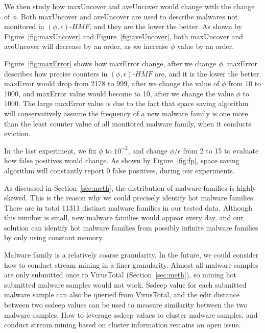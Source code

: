 We then study how maxUncover and aveUncover would change with the change of $\phi$.
Both maxUncover and aveUncover are used to describe malwares not monitored in $(\phi, \epsilon)\mbox{-}HMF$, 
and they are the lower the better. As shown by Figure~\ref{fig:maxUncover} and Figure~\ref{fig:aveUncover}, 
both maxUncover and aveUncover will decrease by an order, as we increase $\phi$ value by an order. 

Figure~\ref{fig:maxError} shows how maxError change, 
after we change $\phi$. 
maxError describes how precise counters in $(\phi, \epsilon)\mbox{-}HMF$ are, 
and it is the lower the better. 
maxError would drop from 2178 to 999, after we change the value of $\phi$ from 10 to 1000, 
and maxError value would become to 10, after we change the value $\phi$ to 1000. 
The large maxError value is due to the fact that space saving algorithm will conservatively 
assume the frequency of a new malware family is one more than the least counter value of all monitored malware family, 
when it conducts eviction. 

In the last experiment, we fix $\phi$ to $10^{-2}$, 
and change $\phi/\epsilon$ from 2 to 15 to evaluate how false positives would change. 
As shown by Figure~\ref{fig:fp}, space saving algorithm will constantly report 0 false positives, during our experiments. 

\label{sec:discussion1}
As discussed in Section~\ref{sec:meth}, 
the distribution of malware families is highly skewed. 
This is the reason why we could precisely identify hot malware families. 
There are in total 11311 distinct malware families in our tested data. 
Although this number is small, new malware families would appear every day, 
and our solution can identify hot malware families from possibly 
infinite malware families by only using constant memory. 

Malware family is a relatively coarse granularity. 
In the future, we could consider how to conduct stream mining in a finer granularity. 
Almost all malware samples are only submitted once to VirusTotal (Section~\ref{sec:meth}), 
so mining hot submitted malware samples would not work. 
Ssdeep value for each submitted malware sample can also be queried from VirusTotal, 
and the edit distance between two ssdeep values can be used to measure similarity between the two malware samples. 
How to leverage ssdeep values to cluster malware samples, 
and conduct stream mining based on cluster information remains an open issue.  
